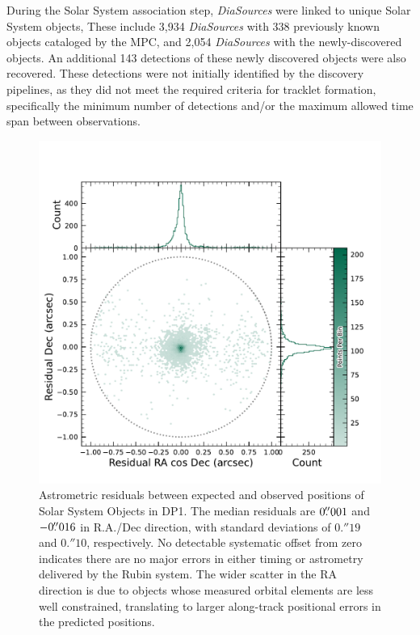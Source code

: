 During the Solar System association step,  \nsolarsystemsources \textit{DiaSources} were linked to \nsolarsystemobjects  unique Solar System objects, 
These include 3,934 \textit{DiaSources} with 338 previously known objects cataloged by the \gls{MPC}, and 2,054 \textit{DiaSources} with the \nnewasteroiddiscoveries  newly-discovered objects. 
An additional 143 detections of these newly discovered objects were also recovered. 
These detections were not initially identified by the discovery pipelines, as they did not meet the required criteria for tracklet formation, specifically the minimum number of detections and/or the maximum allowed time span between observations.

\begin{figure}[htb!]
\includegraphics[width=\linewidth]{sso_residuals}
\caption{Astrometric residuals between expected and observed positions of Solar System Objects in \gls{DP1}. 
The median residuals are $0\mbox{$.\!\!^{\prime\prime}$}001$ and $-0\mbox{$.\!\!^{\prime\prime}$}016$ in R.A./Dec direction, with  standard deviations of $0.''19$ and $0.''10$, respectively. 
No detectable systematic offset from zero indicates there are no major errors in either timing or astrometry delivered by the Rubin system. 
The wider scatter in the RA direction is due to objects whose measured orbital elements are less well constrained, translating to larger along-track positional errors in the predicted positions.}
\label{fig:sso_residuals}
\end{figure}

